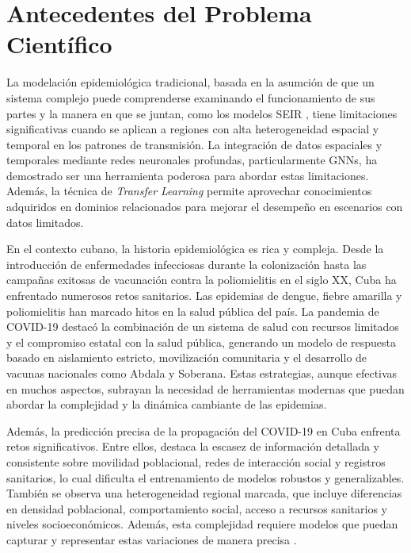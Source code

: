 \section*{Antecedentes del Problema Científico}

La modelación epidemiológica tradicional, basada en la asumción de que un sistema complejo puede comprenderse examinando el funcionamiento de sus partes y la manera en que se juntan, como los modelos SEIR \parencite{Burke2024OriginsSEIR}, tiene limitaciones significativas cuando se aplican a regiones con alta heterogeneidad espacial y temporal en los patrones de transmisión. La integración de datos espaciales y temporales mediante redes neuronales profundas, particularmente GNNs, ha demostrado ser una herramienta poderosa para abordar estas limitaciones. Además, la técnica de \textit{Transfer Learning} permite aprovechar conocimientos adquiridos en dominios relacionados para mejorar el desempeño en escenarios con datos limitados.


En el contexto cubano, la historia epidemiológica es rica y compleja. Desde la introducción de enfermedades infecciosas durante la colonización hasta las campañas exitosas de vacunación contra la poliomielitis en el siglo XX, Cuba ha enfrentado numerosos retos sanitarios. Las epidemias de dengue, fiebre amarilla y poliomielitis han marcado hitos en la salud pública del país. La pandemia de COVID-19 destacó la combinación de un sistema de salud con recursos limitados y el compromiso estatal con la salud pública, generando un modelo de respuesta basado en aislamiento estricto, movilización comunitaria y el desarrollo de vacunas nacionales como Abdala y Soberana. Estas estrategias, aunque efectivas en muchos aspectos, subrayan la necesidad de herramientas modernas que puedan abordar la complejidad y la dinámica cambiante de las epidemias.


Además, la predicción precisa de la propagación del COVID-19 en Cuba enfrenta retos significativos. Entre ellos, destaca la escasez de información detallada y consistente sobre movilidad poblacional, redes de interacción social y registros sanitarios, lo cual dificulta el entrenamiento de modelos robustos y generalizables. También se observa una heterogeneidad regional marcada, que incluye diferencias en densidad poblacional, comportamiento social, acceso a recursos sanitarios y niveles socioeconómicos. Además, esta complejidad requiere modelos que puedan capturar y representar estas variaciones de manera precisa \parencite{Rodriguez2022DataCentric, Panagopoulos_Nikolentzos_Vazirgiannis_2021}.



